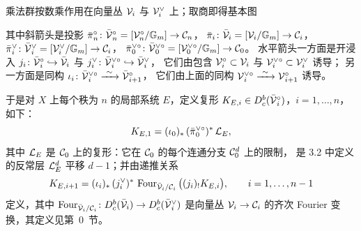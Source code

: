 乘法群按数乘作用在向量丛 $\mathcal{V}_i$ 与 $\mathcal{V}^\vee_i$ 上；取商即得基本图
\begin{center}
\footnotesize
{}
\end{center}
其中斜箭头是投影
$\bar\pi{}^\circ_n\colon\bar{\mathcal{V}}{}^\circ_n=[\mathcal{V}^\circ_n/\mathbb{G}_m]\to\mathcal{C}_n$，
$\bar\pi_i\colon\bar{\mathcal{V}}_i=[\mathcal{V}_i/\mathbb{G}_m]\to\mathcal{C}_i$，
$\bar\pi{}^\vee_i\colon\bar{\mathcal{V}}{}^\vee_i=[\mathcal{V}^\vee_i/\mathbb{G}_m]\to\mathcal{C}_i$，
$\bar\pi{}^{\vee\circ}_0\colon\bar{\mathcal{V}}{}^{\vee\circ}_0=[\mathcal{V}^{\vee\circ}_0/\mathbb{G}_m]\to\mathcal{C}_0$。
水平箭头一方面是开浸入
$j_i\colon\bar{\mathcal{V}}{}^\circ_i\hookrightarrow\bar{\mathcal{V}}_i$ 与
$j^\vee_i\colon\bar{\mathcal{V}}{}^{\vee\circ}_i\hookrightarrow\bar{\mathcal{V}}{}^\vee_i$，
它们由包含 $\mathcal{V}^\circ_i\subset\mathcal{V}_i$ 与 $\mathcal{V}^{\vee\circ}_i\subset\mathcal{V}^\vee_i$ 诱导；
另一方面是同构
$\iota_i\colon\bar\cV{}^{\vee\circ}_i\xrightarrow{\ \sim\ }\bar\cV{}^\circ_{i+1}$，
它们由上面的同构 $\cV{}^{\vee\circ}_i\xrightarrow{\ \sim\ }\cV{}^\circ_{i+1}$ 诱导。

于是对 $X$ 上每个秩为 $n$ 的局部系统 $E$，定义复形
$K_{E,i}\in D^{b}_{c}(\bar{\mathcal{V}}{}^\circ_i)$，$i=1,\dots,n$，如下：
\[
  K_{E,1}=(\iota_0)_*\,(\bar\pi{}^{\vee\circ}_0)^*\,\mathcal{L}_E,
\]
其中 $\mathcal{L}_E$ 是 $\mathcal{C}_0$ 上的复形：它在 $\mathcal{C}_0$ 的每个连通分支 $\mathcal{C}^d_0$ 上的限制，
是 3.2 中定义的反常层 $\mathcal{L}^d_E$ 平移 $d-1$；并由递推关系
\[
  K_{E,i+1}=(\iota_i)_*\,(j^\vee_i)^*\,\operatorname{Four}_{\bar{\mathcal{V}}_i/\mathcal{C}_i}\big((j_i)_!K_{E,i}\big),
  \qquad i=1,\dots,n-1
\]
定义，其中 $\operatorname{Four}_{\bar{\mathcal{V}}_i/\mathcal{C}_i}\colon D^{b}_{c}(\bar{\mathcal{V}}_i)\to D^{b}_{c}(\bar{\mathcal{V}}{}^\vee_i)$ 是向量丛
$\mathcal{V}_i\to\mathcal{C}_i$ 的齐次 Fourier 变换，其定义见第~0~节。

